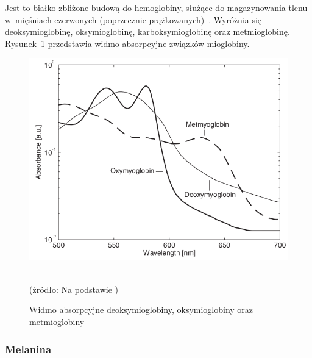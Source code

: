 Jest to białko zbliżone budową do hemoglobiny, służące do magazynowania tlenu w~mięśniach czerwonych (poprzecznie prążkowanych)~\cite{Haggblad:2008}. 
Wyróżnia się deoksymioglobinę, oksymioglobinę, karboksymioglobinę oraz metmioglobinę. Rysunek~\ref{rys:mioglobin} przedstawia widmo absorpcyjne 
związków mioglobiny.
\begin{figure}[h]
\centerline{\includegraphics[scale = 0.50]{graphic/mioglobin.png}}
	\caption{Widmo absorpcyjne deoksymioglobiny, oksymioglobiny oraz metmioglobiny}
	\label{rys:mioglobin}
	~\\
	(źródło: Na podstawie \cite{Haggblad:2008})
\end{figure}

\subsubsection{Melanina}
\label{subsubsec:melanina}

